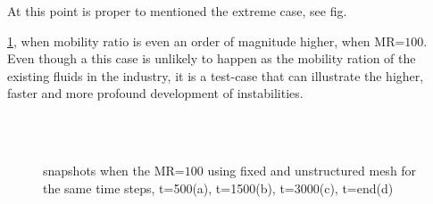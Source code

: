 \documentclass[preprint,authoryear,12pt]{elsarticle}
\begin{document}
At this point is proper to mentioned the extreme case, see fig.{\ref{fig:4testcase}, when mobility ratio is even an order of magnitude higher, when MR=$100$. Even though a this case is unlikely to happen as the mobility ration of the existing fluids in the industry, it is a test-case that can illustrate the higher, faster and more profound development of instabilities.   

\begin{figure}[H]
\centering
{}%
%
\\ 
\\
\caption{snapshots when the MR=$100$ using fixed and unstructured mesh for the same time steps, t=500(a), t=1500(b), t=3000(c), t=end(d) }
\label{fig:4testcase}
\end{figure}



}
\end{document}
